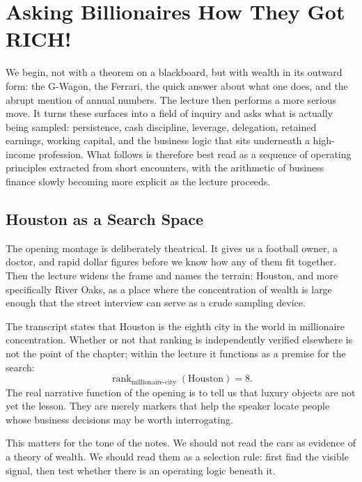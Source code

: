 \chapter{Asking Billionaires How They Got RICH!}

We begin, not with a theorem on a blackboard, but with wealth in its outward form: the G-Wagon, the Ferrari, the quick answer about what one does, and the abrupt mention of annual numbers. The lecture then performs a more serious move. It turns these surfaces into a field of inquiry and asks what is actually being sampled: persistence, cash discipline, leverage, delegation, retained earnings, working capital, and the business logic that sits underneath a high-income profession. What follows is therefore best read as a sequence of operating principles extracted from short encounters, with the arithmetic of business finance slowly becoming more explicit as the lecture proceeds.

\section{Houston as a Search Space}

The opening montage is deliberately theatrical. It gives us a football owner, a doctor, and rapid dollar figures before we know how any of them fit together. Then the lecture widens the frame and names the terrain: Houston, and more specifically River Oaks, as a place where the concentration of wealth is large enough that the street interview can serve as a crude sampling device.

The transcript states that Houston is the eighth city in the world in millionaire concentration. Whether or not that ranking is independently verified elsewhere is not the point of the chapter; within the lecture it functions as a premise for the search:
\begin{equation}
\operatorname{rank}_{\text{millionaire-city}}(\text{Houston}) = 8.
\end{equation}
The real narrative function of the opening is to tell us that luxury objects are not yet the lesson. They are merely markers that help the speaker locate people whose business decisions may be worth interrogating.

This matters for the tone of the notes. We should not read the cars as evidence of a theory of wealth. We should read them as a selection rule: first find the visible signal, then test whether there is an operating logic beneath it.

